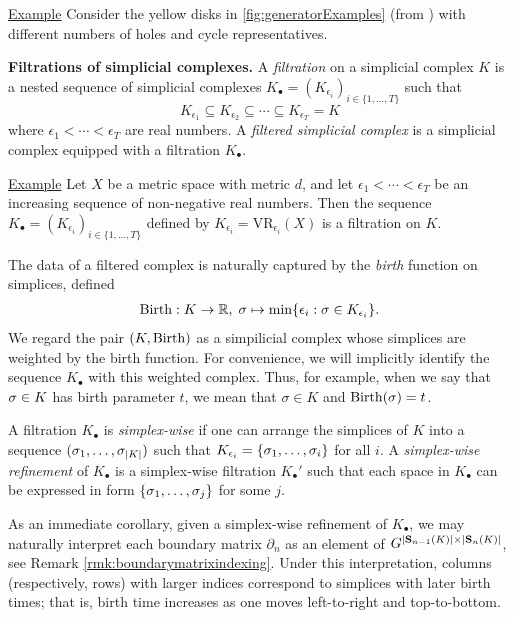 \noindent \underline{Example} Consider the yellow disks in \fig \ref{fig:generatorExamples} (from  \cite{Carlsson2009TopologyAD}) with different numbers of holes and cycle representatives. 


 

\noindent \textbf{Filtrations of simplicial complexes.} A \emph{filtration} on a simplicial complex $K$ is a nested sequence of  simplicial complexes $K_\bullet = (K_{\epsilon_i})_{i \in\{ 1, \ldots, T\}}$ such that
    $$
    K_{\epsilon_1} \subseteq K_{\epsilon_2} \subseteq \cdots \subseteq K_{\epsilon_T} = K
    $$
where $\epsilon_1 < \cdots < \epsilon_T$ are real numbers. A \emph{filtered simplicial complex} is a simplicial complex equipped with a filtration $K_\bullet$.

\noindent \underline{Example}
 Let  $X$ be a metric space with metric $d$, and let  $\epsilon_1 < \cdots < \epsilon_T$ be an increasing sequence of non-negative real numbers.  Then the sequence $K_\bullet = (K_{\epsilon_i})_{i \in\{ 1, \ldots, T\}}$ defined by $K_{\epsilon_i} = \text{VR}_{\epsilon_i}(X)$ is a filtration on $K$.

The data of a filtered complex is naturally captured by the \emph{birth} function on simplices, defined
    \begin{align*}
        \mathrm{Birth}: K \to \mathbb{R}, \; \sigma \mapsto \min\{ \epsilon_i : \sigma \in K_{\epsilon_i} \}.
    \end{align*}
We regard the pair $(K, \mathrm{Birth})$ as a simpilicial complex whose simplices are weighted by the birth function.   For convenience, we will implicitly identify the sequence $K_\bullet$ with this weighted complex.   Thus, for example, when we say that $\sigma \in K$ has birth parameter $t$, we mean that  $\sigma\in K$ and  $\mathrm{Birth}(\sigma) = t$.


\begin{definition}
A filtration $K_\bullet$ is \emph{simplex-wise} if one can arrange the simplices of $K$ into a sequence $(\sigma_1, \ldots, \sigma_{|K|})$ such that $K_{\epsilon_i} = \{\sigma_1, \ldots, \sigma_i\}$ for all $i$.  
A \emph{simplex-wise refinement}  of $K_\bullet$ is a simplex-wise filtration $K_\bullet'$ such that each space in $K_\bullet$ can be expressed in form $\{\sigma_1, \ldots, \sigma_j\}$ for some $j$.
\end{definition}
 

As an immediate corollary, given a simplex-wise refinement of $K_\bullet$, we may naturally interpret each boundary matrix $\partial_n$ as an element of $G^{|\mathbf{S}_{n-1}(K)| \times |\mathbf{S}_{n}(K)|}$, see Remark \ref{rmk:boundarymatrixindexing}.  Under this interpretation, columns (respectively, rows) with larger indices correspond to simplices with later birth times; that is, birth time increases as one moves left-to-right and top-to-bottom.  



